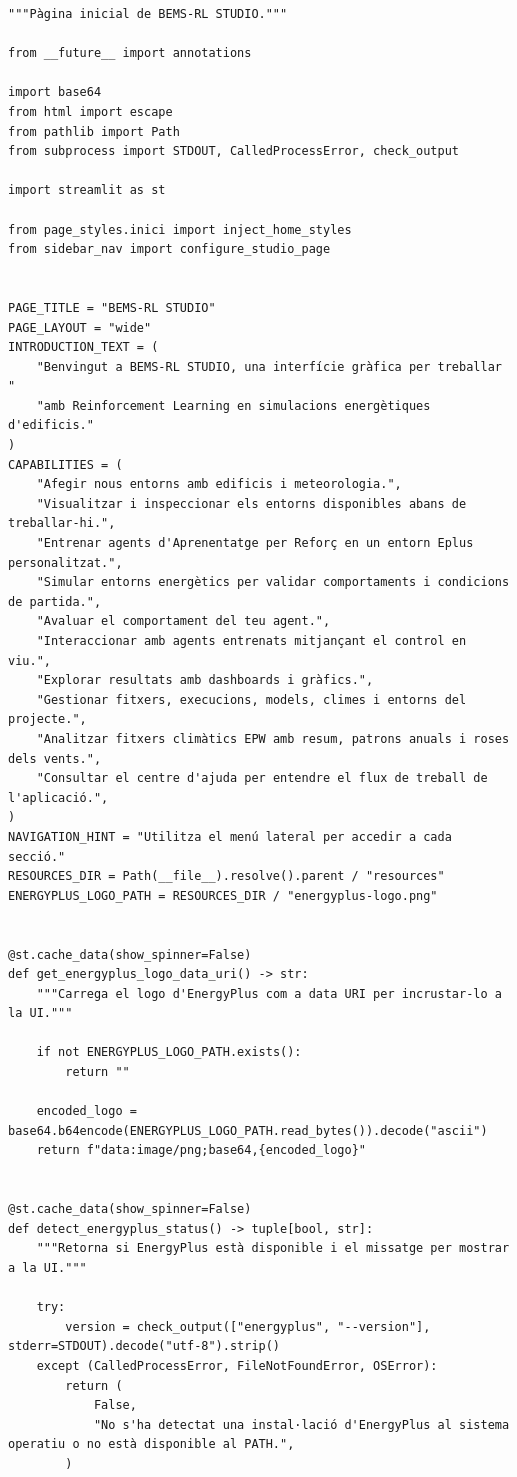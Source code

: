 \documentclass[10pt,a4paper]{article}
\begin{document}
\begin{lstlisting}[style=studioPython,caption={Inici.py},label={lst:inici-py}]
"""Pàgina inicial de BEMS-RL STUDIO."""

from __future__ import annotations

import base64
from html import escape
from pathlib import Path
from subprocess import STDOUT, CalledProcessError, check_output

import streamlit as st

from page_styles.inici import inject_home_styles
from sidebar_nav import configure_studio_page


PAGE_TITLE = "BEMS-RL STUDIO"
PAGE_LAYOUT = "wide"
INTRODUCTION_TEXT = (
    "Benvingut a BEMS-RL STUDIO, una interfície gràfica per treballar "
    "amb Reinforcement Learning en simulacions energètiques d'edificis."
)
CAPABILITIES = (
    "Afegir nous entorns amb edificis i meteorologia.",
    "Visualitzar i inspeccionar els entorns disponibles abans de treballar-hi.",
    "Entrenar agents d'Aprenentatge per Reforç en un entorn Eplus personalitzat.",
    "Simular entorns energètics per validar comportaments i condicions de partida.",
    "Avaluar el comportament del teu agent.",
    "Interaccionar amb agents entrenats mitjançant el control en viu.",
    "Explorar resultats amb dashboards i gràfics.",
    "Gestionar fitxers, execucions, models, climes i entorns del projecte.",
    "Analitzar fitxers climàtics EPW amb resum, patrons anuals i roses dels vents.",
    "Consultar el centre d'ajuda per entendre el flux de treball de l'aplicació.",
)
NAVIGATION_HINT = "Utilitza el menú lateral per accedir a cada secció."
RESOURCES_DIR = Path(__file__).resolve().parent / "resources"
ENERGYPLUS_LOGO_PATH = RESOURCES_DIR / "energyplus-logo.png"


@st.cache_data(show_spinner=False)
def get_energyplus_logo_data_uri() -> str:
    """Carrega el logo d'EnergyPlus com a data URI per incrustar-lo a la UI."""

    if not ENERGYPLUS_LOGO_PATH.exists():
        return ""

    encoded_logo = base64.b64encode(ENERGYPLUS_LOGO_PATH.read_bytes()).decode("ascii")
    return f"data:image/png;base64,{encoded_logo}"


@st.cache_data(show_spinner=False)
def detect_energyplus_status() -> tuple[bool, str]:
    """Retorna si EnergyPlus està disponible i el missatge per mostrar a la UI."""

    try:
        version = check_output(["energyplus", "--version"], stderr=STDOUT).decode("utf-8").strip()
    except (CalledProcessError, FileNotFoundError, OSError):
        return (
            False,
            "No s'ha detectat una instal·lació d'EnergyPlus al sistema operatiu o no està disponible al PATH.",
        )


\end{lstlisting}
\end{document}

